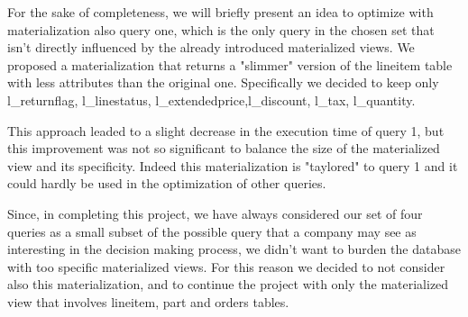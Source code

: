 For the sake of completeness, we will briefly present an idea to optimize with materialization also query one, which is the only query in the chosen set that isn't directly influenced by the already introduced materialized views.
We proposed a materialization that returns a "slimmer" version of the lineitem table with less attributes than the original one. Specifically we decided to keep only l\_returnflag, l\_linestatus, l\_extendedprice,l\_discount, l\_tax, l\_quantity. 

This approach leaded to a slight decrease in the execution time of query 1, but this improvement was not so significant to balance the size of the materialized view and its specificity. Indeed this materialization is "taylored" to query 1 and it could hardly be used in the optimization of other queries.

Since, in completing this project, we have always considered our set of four queries as a small subset of the possible query that a company may see as interesting in the decision making process, we didn't want to burden the database with too specific materialized views. For this reason we decided to not consider also this materialization, and to continue the project with only the materialized view that involves lineitem, part and orders tables.


